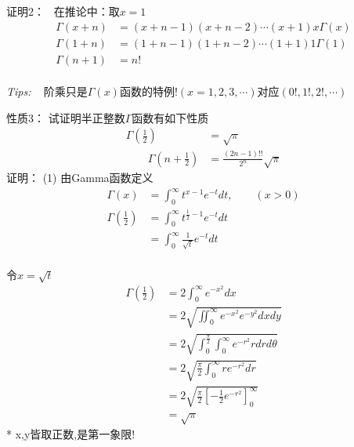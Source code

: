 	{\alert{证明2：} } 	 在推论中：取$x=1$
	\begin{equation*}
	\begin{split}	
		\Gamma(x+n)&=(x+n-1)(x+n-2)\cdots (x+1)x\Gamma(x)\\
		\Gamma(1+n)&=(1+n-1)(1+n-2)\cdots (1+1)1\Gamma(1)\\
		\Gamma(n+1)&=n!
	\end{split}
	\end{equation*}	 
	~~\\ \vspace{4em}
{\alert{\textit{Tips:\hspace{1em}}} }~ 阶乘只是$\Gamma(x)$函数的特例!$(x=1,2,3,\cdots)$对应$ (0!, 1!, 2!,\cdots)$




	{\alert{性质3：}} 试证明半正整数$\Gamma$函数有如下性质 
	\begin{equation*}
		\begin{split}
		\Gamma(\frac{1}{2}) &=\sqrt{\pi} \\ 
		\qquad  \Gamma(n+\frac{1}{2}) &= \frac{(2n-1)!!}{2^n} \sqrt{\pi}
		\end{split}	
	\end{equation*}	
	{\alert{证明：} } (1) 由Gamma函数定义
	\[
	\begin{aligned}
		 \Gamma(x)&=\int_{0}^{\infty} t^{x-1} e^{-t} dt, \qquad (x>0) \\
		 \Gamma(\frac{1}{2})&=\int_{0}^{\infty} t^{\frac{1}{2}-1} e^{-t} dt\\
		 &=\int_{0}^{\infty} \frac{1}{\sqrt{t}} e^{-t} dt\\
	\end{aligned}	
	\]



	  {}
	  令$x=\sqrt{t}$
	  \[
		\begin{aligned}
			 \Gamma(\frac{1}{2})
			 &=2\int_{0}^{\infty} e^{-x^2} dx\\
			 &=2\sqrt{\iint_{0}^{\infty} e^{-x^2} e^{-y^2} dxdy}\\
			 &=2\sqrt{\int_{0}^{\frac{\pi}{2}} \int_{0}^{\infty}  e^{-r^2} r dr d\theta}\\
			 &=2\sqrt{\frac{\pi}{2} \int_{0}^{\infty} r e^{-r^2} dr }\\
			 &=2\sqrt{\frac{\pi}{2}[-\frac{1}{2} e^{-r^2}]_{0}^{\infty} }\\
			 &=\sqrt{\pi}
		\end{aligned}	
		\]  
	* x,y皆取正数,是第一象限!			



